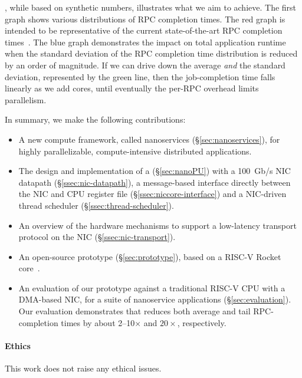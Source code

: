 , while based on synthetic numbers, illustrates what we aim to achieve.
The first graph shows various distributions of RPC completion times. 
The red graph is intended to be representative of the current state-of-the-art RPC completion times~\cite{eRPC}. The blue graph demonstrates the impact on total application runtime when the standard deviation of the RPC completion time distribution is reduced by an order of magnitude.
If we can drive down the average {\em and} the standard deviation, represented by the green line, then the job-completion time falls linearly as we add cores, until eventually the per-RPC overhead limits parallelism.

In summary, we make the following contributions:
\begin{itemize}[topsep=0.4\baselineskip, leftmargin=20pt]
    \item A new compute framework, called nanoservices (\S\ref{sec:nanoservices}), for highly parallelizable, compute-intensive distributed applications.
    \item The design and implementation of a \name{} (\S\ref{sec:nanoPU}) with a \SI{100}{Gb/s} NIC datapath (\S\ref{ssec:nic-datapath}), a message-based interface directly between the NIC and CPU register file (\S\ref{ssec:niccore-interface}) and a NIC-driven thread scheduler (\S\ref{ssec:thread-scheduler}).
    \item An overview of the hardware mechanisms to support a low-latency transport protocol on the NIC (\S\ref{ssec:nic-transport}).
    \item An open-source \name{} prototype (\S\ref{sec:prototype}), based on a RISC-V Rocket core~\cite{rocket-chip}.
    \item An evaluation of our \name{} prototype against a traditional RISC-V CPU with a DMA-based NIC, for a suite of nanoservice applications (\S\ref{sec:evaluation}). 
    Our evaluation demonstrates that \name{} reduces both average and tail RPC-completion times by about 2--10$\times$ and $20\times$, respectively.
\end{itemize}

\paragraph{Ethics} This work does not raise any ethical issues.

